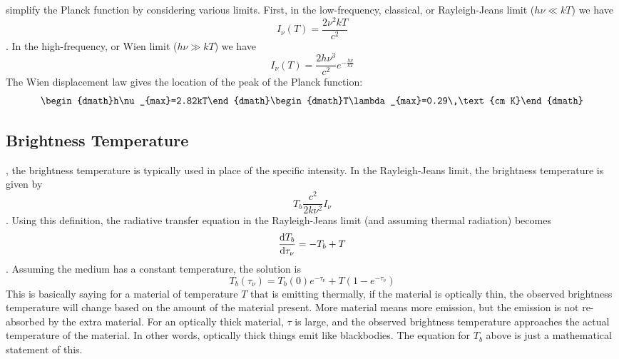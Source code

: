  simplify the Planck function by considering various limits.  First,
in the low-frequency, classical, or Rayleigh-Jeans limit ($h\nu\ll kT$) we have
\begin{dmath}\boxed{I_{\nu}(T)=\frac{2\nu^2kT}{c^2}}\end{dmath}.
In the high-frequency, or Wien limit ($h\nu\gg kT$) we have
\begin{dmath}I_{\nu}(T)=\frac{2h\nu^3}{c^2}e^{-\frac{h\nu}{kT}}\end{dmath}
The Wien displacement law gives the location of the peak of the Planck function:
\begin{dgroup}
\begin{dmath}h\nu_{max}=2.82kT\end{dmath}
\begin{dmath}T\lambda_{max}=0.29\,\text{cm K}\end{dmath}
\end{dgroup}

\subsection{Brightness Temperature}
, the brightness temperature is typically used in place of
the specific intensity.  In the Rayleigh-Jeans limit, the brightness temperature is given by
\begin{dmath}
    T_b \frac{c^2}{2k\nu^2}I_\nu
\end{dmath}.
Using this definition, the radiative transfer equation in the Rayleigh-Jeans limit (and
assuming thermal radiation) becomes
\begin{dmath}\frac{\d T_b}{\d\tau_{\nu}}=-T_b+T\end{dmath}.
Assuming the medium has a constant temperature, the solution is
\begin{dmath}T_b(\tau_{\nu})=T_b(0)e^{-\tau_{\nu}}+T(1-e^{-\tau_{\nu}})\end{dmath}
This is basically saying for a material of temperature $T$ that is emitting thermally, if the 
material is optically thin, the observed brightness temperature will change based on the amount 
of the material present.  More material means more emission, but the emission is not re-absorbed 
by the extra material.  For an optically thick material, $\tau$ is large, and the observed 
brightness temperature approaches the actual temperature of the material.  In other words, 
optically thick things emit like blackbodies.  The equation for $T_b$ above is just a mathematical 
statement of this.

